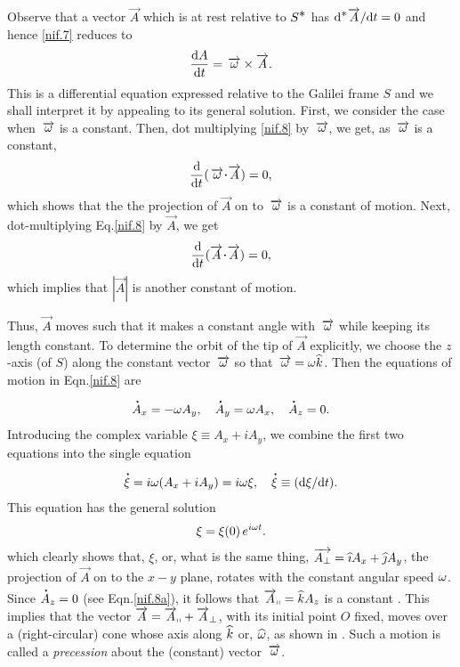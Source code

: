 Observe that a vector $\vec{A}$ which is {at rest} relative 
to $S^\bst$ has $\dd ^{\bst}\vec{A}/\dd t = 0 $ and  
hence 
\eqref{nif.7} reduces to
\begin{align}\label{nif.8}
 \dv{A}{t} = \,\vec{\gkw}\times \vec{A}.
\end{align}
This is a differential equation expressed relative to the  
Galilei frame $S$ and we shall interpret it by appealing to 
its general solution. First, we consider the case when 
$\,\vec{\gkw}$ is a constant. Then, dot multiplying 
\eqref{nif.8} by $ \,\vec{\gkw}$, we get, as  
$\,\vec{\gkw}$ is a constant,
\begin{align*}
\dv{}{t} (\,\vec{\gkw}\dotp \vec{A})=0,
\end{align*}
which shows that the the projection of $\vec{A}$ on to 
$\,\vec{\gkw}$ is a constant of motion. Next, 
dot-multiplying Eq.\eqref{nif.8} by $\vec{A}$, we get
\begin{align*}
\dv{}{t} (\vec{A}\dotp \vec{A})=0,
\end{align*}
which implies that $|\vec{A}|$ is another constant of 
motion.

Thus, $\vec{A}$ moves such that it makes a constant 
angle with $\,\vec{\gkw}$ while keeping its length 
constant. To determine the orbit of the tip of 
$\vec{A}$ explicitly, we choose the $z$-axis (of $S$) 
along the constant vector $\,\vec{\gkw}$ so that 
$\,\vec{\gkw} =\gkw \kay$. Then the equations of motion 
in Eqn.\eqref{nif.8} are 
\begin{align}\label{nif.8a}
\dotup{A}_x =-\gkw A_y,\quad 
\dotup{A}_y =\gkw A_x, \quad \dotup{A}_z =0. 
\end{align} 
Introducing the complex variable $\xi \equiv A_x +i A_y $, 
we combine the first two equations into the single equation
\begin{align*}
\dotup{\xi} =i \gkw(A_x +iA_y)=i\gkw
\xi,\quad \dotup{\xi}\equiv
(\dd \xi/\dd t).
\end{align*}
This equation has the general solution
\begin{align*}
\xi =\xi(0)\, e^{i \gkw t}.
\end{align*}
which clearly shows that, $\xi$, or, what is the same 
thing, $\vec{A_{\perp}} =\eye A_x +\jay A_y$, the 
projection of $\vec{A}$ on to the $x-y$ plane, rotates 
with the constant angular speed $\gkw$. Since  
$\dotup{A}_z =0$ (see Eqn.\eqref{nif.8a}), it follows 
that  $\vec{A}_\shortparallel=\kay A_z$ is a constant . 
This implies that the vector 
$\vec{A}=\vec{A}_\shortparallel +\vec{A}_{\perp}$,  
with its initial point $O$ fixed, moves over a 
(right-circular) cone whose axis along $\kay $ or, 
$\hat{\gkw}$, as shown in .  Such a 
motion is called a \textsl{precession} about the 
(constant) vector $\,\vec{\gkw}$.

